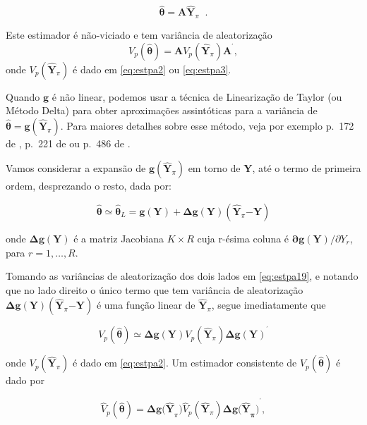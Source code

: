 \documentclass[]{book}
\theoremstyle{definition}
\theoremstyle{definition}
\theoremstyle{definition}
\theoremstyle{remark}
\begin{document}
\[
\mathbf{\hat{\theta}}=\mathbf{A\hat{Y}}_{\pi }\;\;. 
\]

Este estimador é não-viciado e tem variância de aleatorização \[
V_{p}\left( \mathbf{\hat{\theta}}\right) =\mathbf{A}V_{p}\left( \mathbf{\hat{Y}}_{\pi }\right) \mathbf{A}^{^{\prime }}\mathbf{,} 
\] onde \(V_{p}\left( \mathbf{\hat{Y}}_{\pi }\right)\) é dado em
\eqref{eq:estpa2} ou \eqref{eq:estpa3}.

Quando \(\mathbf{g}\) é não linear, podemos usar a técnica de
Linearização de Taylor (ou Método Delta) para obter aproximações
assintóticas para a variância de
\(\mathbf{\hat{\theta}}=\mathbf{g}\left( \widehat{\mathbf{Y}}_{\pi }\right)\).
Para maiores detalhes sobre esse método, veja por exemplo p.~172 de
\citep{SSW92}, p.~221 de \citep{W85} ou p.~486 de \citep{Bishop}.

Vamos considerar a expansão de
\(\mathbf{g}\left( \mathbf{\hat{Y}}_{\pi }\right)\) em torno de
\(\mathbf{Y}\), até o termo de primeira ordem, desprezando o resto, dada
por:

\begin{equation}
\mathbf{\hat{\theta}\simeq \hat{\theta}}_{L}=\mathbf{g(Y)+\Delta g(Y)}\left( 
\mathbf{\hat{Y}}_{\pi }\mathbf{-Y}\right)  \label{eq:estpa19}
\end{equation}

onde \(\mathbf{\Delta g(Y)}\) é a matriz Jacobiana \(K\times R\) cuja
r-ésima coluna é \(\mathbf{\partial g(Y)/}\partial Y_{r}\),\\
para \(r=1,\ldots,R\).

Tomando as variâncias de aleatorização dos dois lados em
\eqref{eq:estpa19}, e notando que no lado direito o único termo que tem
variância de aleatorização
\(\mathbf{\Delta g(Y)}\left( \mathbf{\hat{Y}}_{\pi }\mathbf{-Y}\right)\)
é uma função linear de \(\mathbf{\hat{Y}}_{\pi}\), segue imediatamente
que

\begin{equation}
V_{p}\left( \mathbf{\hat{\theta}}\right) \mathbf{\simeq \Delta g(Y)}
V_{p}\left( \mathbf{\hat{Y}}_{\pi }\right) \mathbf{\Delta g(Y)}^{^{\prime }}
\label{eq:estpa20}
\end{equation}

onde \(V_{p}\left( \mathbf{\hat{Y}}_{\pi }\right)\) é dado em
\eqref{eq:estpa2}. Um estimador consistente de
\(V_{p}\left( \mathbf{\hat{\theta}}\right)\) é dado por

\begin{equation}
\hat{V}_{p}\left( \mathbf{\hat{\theta}}\right) =\mathbf{\Delta g(\hat{Y}}_{\pi }\mathbf{)}\hat{V}_{p}\left( \mathbf{\hat{Y}}_{\pi }\right) \mathbf{\Delta g\mathbf{(\hat{Y}}_{\pi }\mathbf{)}}^{^{\prime }},  \label{eq:estpa21}
\end{equation}
\end{document}
